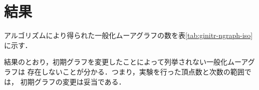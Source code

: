 \section{結果}
アルゴリズムにより得られた一般化ムーアグラフの数を表\ref{tab:ginitr-ngraph-iso}
に示す．



結果のとおり，初期グラフを変更したことによって列挙されない一般化ムーアグラフは
存在しないことが分かる．つまり，実験を行った頂点数と次数の範囲では，
初期グラフの変更は妥当である．
